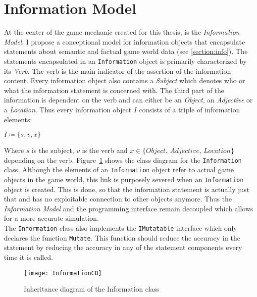 \section{Information Model}
At the center of the game mechanic created for this thesis, is the \textit{Information Model}. I propose a conceptional model for information objects that encapsulate statements about semantic and factual game world data (see \ref{section:info}). The statements encapsulated in an \verb|Information| object is primarily characterized by its \textit{Verb}. The verb is the main indicator of the assertion of the information content. Every information object also contains a \textit{Subject} which denotes who or what the information statement is concerned with. The third part of the information is dependent on the verb and can either be an \textit{Object}, an \textit{Adjective} or a \textit{Location}.
Thus every information object $I$ consists of a triple of information elements:
\begin{center}
	$I \coloneqq \{s, v, x\}$ 
\end{center}
Where $s$ is the subject, $v$ is the verb and $x \in \{\textit{Object, Adjective, Location}\}$ depending on the verb. Figure~\ref{fig:informationCD} shows the class diagram for the \verb|Information| class. Although the elements of an \verb|Information| object refer to actual game objects in the game world, this link is purposely severed when an \verb|Information| object is created. This is done, so that the information statement is actually just that and has no exploitable connection to other objects anymore. Thus the \textit{Information Model} and the programming interface remain decoupled which allows for a more accurate simulation.\\
The \verb|Information| class also implements the \verb|IMutatable| interface which only declares the function \verb|Mutate|. This function should reduce the accuracy in the statement by reducing the accuracy in any of the statement components every time it is called.
\begin{figure}
	\centering
	\texttt{[image: InformationCD]}
	\caption{Inheritance diagram of the Information class}
	\label{fig:informationCD}
\end{figure}
